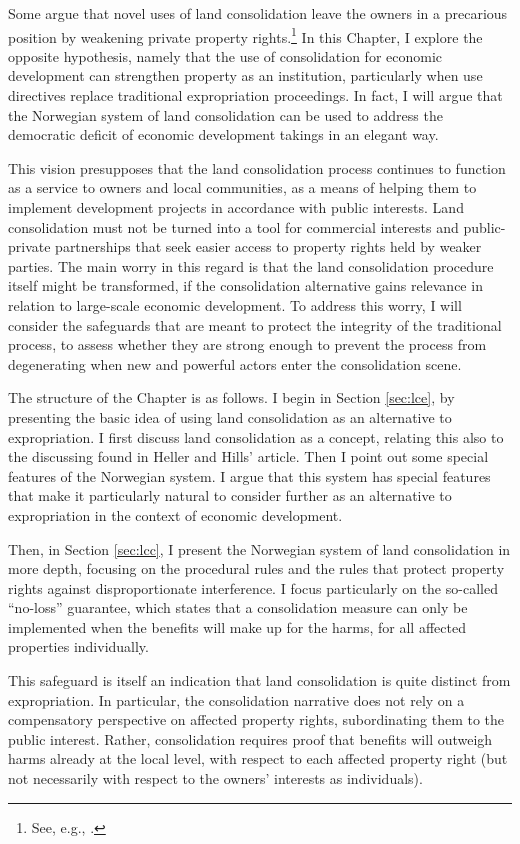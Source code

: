 Some argue that novel uses of land consolidation leave the owners in a precarious position by weakening private property rights.\footnote{See, e.g., \cite{stenseth07}.} In this Chapter, I explore the opposite hypothesis, namely that the use of consolidation for economic development can strengthen property as an institution, particularly when use directives replace traditional expropriation proceedings. In fact, I will argue that the Norwegian system of land consolidation can be used to address the democratic deficit of economic development takings in an elegant way.

This vision presupposes that the land consolidation process continues to function as a service to owners and local communities, as a means of helping them to implement development projects in accordance with public interests. Land consolidation must not be turned into a tool for  commercial interests and public-private partnerships that seek easier access to property rights held by weaker parties. The main worry in this regard is that the land consolidation procedure itself might be transformed, if the consolidation alternative gains relevance in relation to large-scale economic development. To address this worry, I will consider the safeguards that are meant to protect the integrity of the traditional process, to assess whether they are strong enough to prevent the process from degenerating when new and powerful actors enter the consolidation scene.

The structure of the Chapter is as follows. I begin in Section \ref{sec:lce}, by presenting the basic idea of using land consolidation as an alternative to expropriation. I first discuss land consolidation as a concept, relating this also to the discussing found in Heller and Hills' article. Then I point out some special features of the Norwegian system. I argue that this system has special features that make it particularly natural to consider further as an alternative to expropriation in the context of economic development.

Then, in Section \ref{sec:lcc}, I present the Norwegian system of land consolidation in more depth, focusing on the procedural rules and the rules that protect property rights against disproportionate interference. I focus particularly on the so-called ``no-loss'' guarantee, which states that a consolidation measure can only be implemented when the benefits will make up for the harms, for all affected properties individually. 

This safeguard is itself an indication that land consolidation is quite distinct from expropriation. In particular, the consolidation narrative does not rely on a  compensatory perspective on affected property rights, subordinating them to the public interest. Rather, consolidation requires proof that benefits will outweigh harms already at the local level, with respect to each affected property right (but not necessarily with respect to the owners' interests as individuals).


